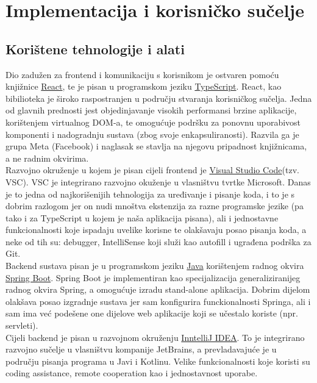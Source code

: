 \chapter{Implementacija i korisničko sučelje}
		
		
		\section{Korištene tehnologije i alati}
		
			Dio  zadužen za frontend i komunikaciju s korisnikom je ostvaren pomoću knjižnice \href{https://react.dev/}{React}, te je pisan u programskom jeziku
			\href{https:www.typescriptlang.org/}{TypeScript}. React, kao bibilioteka je široko raspostranjen u području stvaranja korisničkog sučelja. Jedna od glavnih prednosti jest objedinjavanje visokih performansi brzine aplikacije, korištenjem 
virtualnog DOM-a, te omogućuje podršku za ponovnu uporabivost komponenti i nadogradnju sustava (zbog svoje enkapsuliranosti). Razvila ga je grupa Meta (Facebook) i naglasak se stavlja na njegovu pripadnost knjižnicama, a ne radnim okvirima. \\
			Razvojno okruženje u kojem je pisan cijeli frontend je \href{https://code.visualstudio.com/}{Visual Studio Code}(tzv. VSC). VSC je integrirano razvojno okuženje u vlasništvu tvrtke Microsoft. Danas je to jedna od najkorišenijih tehnologija za uređivanje i pisanje koda, i to je s dobrim razlogom jer on nudi mnoštva ekstenzija za razne programske jezike (pa tako i za TypeScript u kojem je naša aplikacija pisana), ali i jednostavne funkcionalnosti koje ispadaju uvelike korisne te olakšavaju posao pisanja koda, a neke od tih su: debugger, IntelliSense koji služi kao autofill i ugrađena podrška za Git. \\
			Backend sustava pisan je u programskom jeziku \href{https://www.java.com/en/}{Java} korištenjem radnog okvira \href{https://spring.io/projects/spring-boot/}{Spring Boot}. Spring Boot je implementiran kao specijalizacija generaliziranijeg radnog okvira Spring, a omogućuje izradu stand-alone aplikacija. Dobrim dijelom olakšava posao izgradnje sustava jer sam konfigurira funckionalnosti Springa, ali i sam ima već podešene one dijelove web aplikacije koji se učestalo koriste (npr. servleti).\\
			Cijeli backend je pisan u razvojnom okruženju \href{https://www.jetbrains.com/idea/}{InntelliJ IDEA}. To je integrirano razvojno sučelje u vlasništvu kompanije JetBrains, a prevladavajuće je u području pisanja programa u Javi i Kotlinu. Velike funkcionalnosti koje koristi su coding assistance, remote cooperation kao i jednostavnost uporabe. \\
